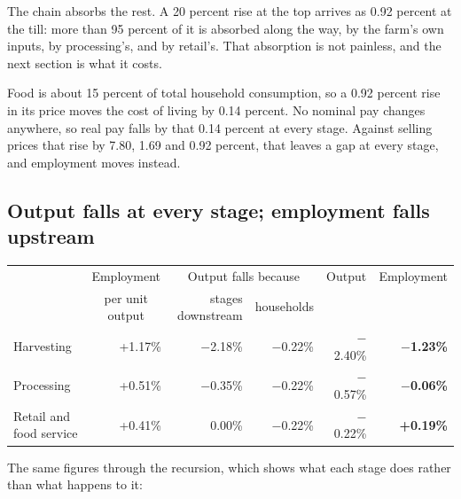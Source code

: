 \documentclass[11pt,a4paper]{article}
\begin{document}
The chain absorbs the rest. A 20 percent rise at the top arrives as 0.92 percent at the till: more than 95 percent of it is absorbed along the way, by the farm's own inputs, by processing's, and by retail's. That absorption is not painless, and the next section is what it costs.

Food is about 15 percent of total household consumption, so a 0.92 percent rise in its price moves the cost of living by 0.14 percent. No nominal pay changes anywhere, so real pay falls by that 0.14 percent at every stage. Against selling prices that rise by 7.80, 1.69 and 0.92 percent, that leaves a gap at every stage, and employment moves instead.

\subsection{Output falls at every stage; employment falls upstream}
\label{sec:empl}

\begin{center}
\small
\setlength{\tabcolsep}{4.2pt}
\begin{tabular}{lrrrrr}
\toprule
 & \multicolumn{1}{c}{Employment} & \multicolumn{2}{c}{Output falls because} & \multicolumn{1}{c}{Output} & \multicolumn{1}{c}{Employment} \\
 & \multicolumn{1}{c}{per unit output} & stages downstream & households & & \\
\midrule
Harvesting & +1.17\% & $-$2.18\% & $-$0.22\% & $-$2.40\% & \textbf{$-$1.23\%} \\
Processing & +0.51\% & $-$0.35\% & $-$0.22\% & $-$0.57\% & \textbf{$-$0.06\%} \\
Retail and food service & +0.41\% & \phantom{$-$}0.00\% & $-$0.22\% & $-$0.22\% & \textbf{+0.19\%} \\
\bottomrule
\end{tabular}
\end{center}

The same figures through the recursion, which shows what each stage does rather than what happens to it:
\end{document}
